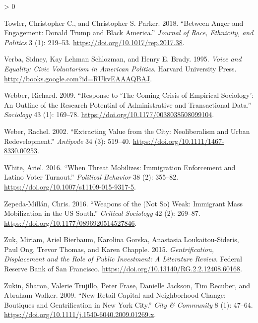 \documentclass[
  12pt,
]{article}
\newlength{\cslhangindent}
\newenvironment{CSLReferences}[2] %
 {%
  \setlength{\parindent}{0pt}
  \ifodd #1 \everypar{\setlength{\hangindent}{\cslhangindent}}\ignorespaces\fi
  \ifnum #2 > 0
  \setlength{\parskip}{#2\baselineskip}
  \fi
 }%
 {}
\begin{document}
\begin{CSLReferences}{1}{0}
\leavevmode\hypertarget{ref-Towler2018}{}%
Towler, Christopher C., and Christopher S. Parker. 2018. {``Between {Anger} and {Engagement}: {Donald Trump} and {Black America}.''} \emph{Journal of Race, Ethnicity, and Politics} 3 (1): 219--53. \url{https://doi.org/10.1017/rep.2017.38}.

\leavevmode\hypertarget{ref-Verba1995}{}%
Verba, Sidney, Kay Lehman Schlozman, and Henry E. Brady. 1995. \emph{Voice and {Equality}: {Civic Voluntarism} in {American Politics}}. {Harvard University Press}. \url{http://books.google.com?id=RUkvEAAAQBAJ}.

\leavevmode\hypertarget{ref-Webber2009}{}%
Webber, Richard. 2009. {``Response to {`{The Coming Crisis} of {Empirical Sociology}'}: {An Outline} of the {Research Potential} of {Administrative} and {Transactional Data}.''} \emph{Sociology} 43 (1): 169--78. \url{https://doi.org/10.1177/0038038508099104}.

\leavevmode\hypertarget{ref-Weber2002}{}%
Weber, Rachel. 2002. {``Extracting {Value} from the {City}: {Neoliberalism} and {Urban Redevelopment}.''} \emph{Antipode} 34 (3): 519--40. \url{https://doi.org/10.1111/1467-8330.00253}.

\leavevmode\hypertarget{ref-White2016}{}%
White, Ariel. 2016. {``When {Threat Mobilizes}: {Immigration Enforcement} and {Latino Voter Turnout}.''} \emph{Political Behavior} 38 (2): 355--82. \url{https://doi.org/10.1007/s11109-015-9317-5}.

\leavevmode\hypertarget{ref-Zepeda-Millan2016}{}%
Zepeda-Millán, Chris. 2016. {``Weapons of the ({Not So}) {Weak}: {Immigrant Mass Mobilization} in the {US South}.''} \emph{Critical Sociology} 42 (2): 269--87. \url{https://doi.org/10.1177/0896920514527846}.

\leavevmode\hypertarget{ref-Zuk2015}{}%
Zuk, Miriam, Ariel Bierbaum, Karolina Gorska, Anastasia Loukaitou-Sideris, Paul Ong, Trevor Thomas, and Karen Chapple. 2015. \emph{Gentrification, {Displacement} and the {Role} of {Public Investment}: {A Literature Review}}. {Federal Reserve Bank of San Francisco}. \url{https://doi.org/10.13140/RG.2.2.12408.60168}.

\leavevmode\hypertarget{ref-Zukin2009}{}%
Zukin, Sharon, Valerie Trujillo, Peter Frase, Danielle Jackson, Tim Recuber, and Abraham Walker. 2009. {``New {Retail Capital} and {Neighborhood Change}: {Boutiques} and {Gentrification} in {New York City}.''} \emph{City \& Community} 8 (1): 47--64. \url{https://doi.org/10.1111/j.1540-6040.2009.01269.x}.

\end{CSLReferences}
\end{document}
